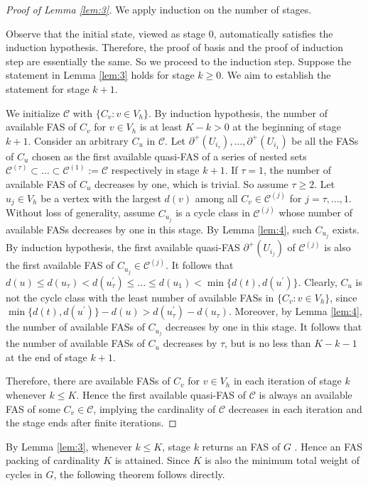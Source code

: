 \documentclass[11pt]{article}
\begin{document}
\begin{proof}[Proof of Lemma \ref{lem:3}]
We apply induction on the number of stages.

Observe that the initial state, viewed as stage 0, automatically satisfies the induction hypothesis. Therefore, the proof of basis and the proof of induction step are essentially the same. So we proceed to the induction step. Suppose the statement in Lemma \ref{lem:3} holds for stage $k\geq 0$. We aim to establish the statement for stage $k+1$.

We initialize $\mathcal{C}$ with $\{C_v:v\in V_h\}$. By induction hypothesis,  the number of available FAS of $C_v$ for $v\in V_h$ is at least $K-k>0$ at the beginning of stage $k+1$. Consider an arbitrary $C_u$ in $\mathcal{C}$. Let $\partial^+(U_{i_\tau}),\dots,\partial^+(U_{i_1})$ be all the FASs of $C_u$ chosen as the first available quasi-FAS of a series of nested sets $\mathcal{C}^{(\tau)}\subset\dots\subset\mathcal{C}^{(1)}:=\mathcal{C}$ respectively in stage $k+1$. If $\tau=1$, the number of available FAS of $C_u$ decreases by one, which is trivial. So assume $\tau\geq 2$. Let $u_j\in V_h$ be a vertex with the largest $d(v)$ among all $C_v\in \mathcal{C}^{(j)}$ for $j=\tau,\dots,1$. Without loss of generality, assume $C_{u_j}$ is a cycle class in $\mathcal{C}^{(j)}$ whose number of available FASs decreases by one in this stage. By Lemma \ref{lem:4}, such $C_{u_j}$ exists. By induction hypothesis, the first available quasi-FAS $\partial^+(U_{i_j})$ of $\mathcal{C}^{(j)}$ is also the first available FAS of $C_{u_j}\in \mathcal{C}^{(j)}$. It follows that $d(u)\leq d(u_\tau)< d(u^\prime_\tau)\leq\dots\leq d(u_1)< \min\{d(t),d(u^\prime)\}$. Clearly, $C_u$ is not the cycle class with the least number of available FASs in $\{C_v:v\in V_h\}$, since $\min\{d(t),d(u^\prime)\}-d(u)> d(u_\tau^\prime)-d(u_\tau)$. Moreover, by Lemma \ref{lem:4}, the number of available FASs of $C_{u_j}$ decreases by one in this stage. It follows that the number of available FASs of $C_u$ decreases by $\tau$, but is no less than $K-k-1$ at the end of stage $k+1$.

Therefore, there are available FASs of $C_v$ for $v\in V_h$ in each iteration of stage $k$ whenever $k\leq K$. Hence the first available quasi-FAS of $\mathcal{C}$ is always an available FAS of some $C_v\in \mathcal{C}$, implying the cardinality of $\mathcal{C}$ decreases in each iteration and the stage ends after finite iterations.
\end{proof}

By Lemma \ref{lem:3}, whenever $k\leq K$, stage $k$ returns an FAS of $G$ . Hence an FAS packing of cardinality $K$ is attained. Since $K$ is also the minimum total weight of cycles in $G$, the following theorem follows directly.
\end{document}
